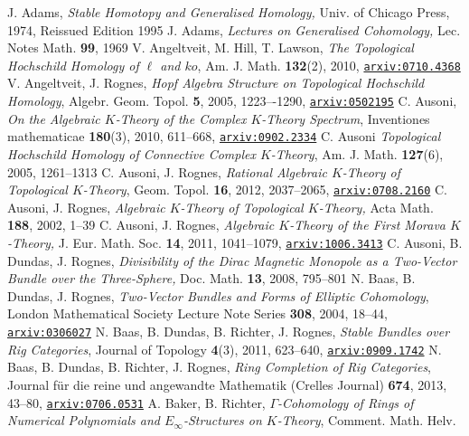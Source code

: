 \documentclass[12pt,bibliography=totoc,final]{scrbook} %
\def\l{\ell} \def\L{\mathcal{L}} \def\R{\mathcal{R}} \def\RR{\mathbb{R}} \def\M{\mathcal{M}(\mathcal{R})} \def\MM{\mathcal{M}} \def\CC{\mathbb{C}} \def\fC{\mathfrak{C}}
\def\arxiv#1{\href{http://arxiv.org/abs/#1}{\texttt{arxiv:#1}}} \def\arxivold#1{\href{http://arxiv.org/abs/math/#1}{\texttt{arxiv:#1}}}
\begin{document}
   
   \clearpage \begin{thebibliography}{9999999}
 J. Adams, \emph{Stable Homotopy and Generalised Homology,} Univ. of Chicago Press, 1974, Reissued Edition 1995 
 J. Adams, \emph{Lectures on Generalised Cohomology,} Lec. Notes Math. \textbf{99}, 1969
 V. Angeltveit, M. Hill, T. Lawson, \emph{The Topological
Hochschild Homology of $\l$ and $ko$}, Am. J. Math. \textbf{132}(2), 2010, \arxiv{0710.4368}
 V. Angeltveit, J. Rognes, \emph{Hopf Algebra Structure on Topological 
Hochschild Homology}, Algebr. Geom. Topol. \textbf{5}, 2005, 1223–-1290, \arxivold{0502195}
 C. Ausoni, \emph{On the Algebraic $K$-Theory of the Complex $K$-Theory 
Spectrum}, Inventiones mathematicae \textbf{180}(3), 2010, 611--668, \arxiv{0902.2334}
 C. Ausoni \emph{Topological Hochschild Homology of Connective Complex 
$K$-Theory}, Am. J. Math. \textbf{127}(6), 2005, 1261--1313 %
 C. Ausoni, J. Rognes, \emph{Rational Algebraic $K$-Theory of 
Topological $K$-Theory}, Geom. Topol. \textbf{16}, 2012, 2037--2065, \arxiv{0708.2160}
 C. Ausoni, J. Rognes, \emph{Algebraic $K$-Theory of Topological $K$-Theory,}
Acta Math. \textbf{188}, 2002, 1--39
 C. Ausoni, J. Rognes, \emph{Algebraic $K$-Theory of the First Morava
$K$-Theory,} J. Eur. Math. Soc. \textbf{14}, 2011, 1041--1079, \arxiv{1006.3413}
 C. Ausoni, B. Dundas, J. Rognes, \emph{ Divisibility of the Dirac Magnetic 
Monopole as a Two-Vector Bundle over the Three-Sphere,} Doc. Math. \textbf{13}, 2008, 795--801
 N. Baas, B. Dundas, J. Rognes, \emph{Two-Vector Bundles and Forms of 
Elliptic Cohomology}, {London Mathematical Society Lecture Note Series
\textbf{308}}, 2004, 18--44, \arxivold{0306027}
 N. Baas, B. Dundas, B. Richter, J. Rognes, \emph{Stable Bundles over 
Rig Categories}, {Journal of Topology \textbf{4}(3)}, 2011, 
623--640, \arxiv{0909.1742}
 N. Baas, B. Dundas, B. Richter, J. Rognes, \emph{Ring Completion of 
Rig Categories}, {Journal f{\"u}r die reine und angewandte Mathematik 
(Crelles Journal) \textbf{674}}, 2013, 43--80, \arxiv{0706.0531}
 A. Baker, B. Richter, \emph{$\Gamma$-Cohomology of Rings of Numerical
Polynomials and $E_\infty$-Structures on $K$-Theory}, Comment. Math. Helv.

\end{thebibliography}
\end{document}
